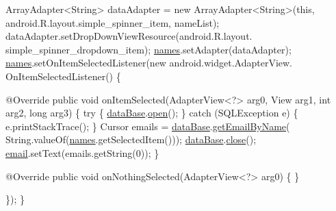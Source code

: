 \begin{DoxyCode}
        ArrayAdapter<String> dataAdapter = \textcolor{keyword}{new} ArrayAdapter<String>(\textcolor{keyword}{this}, 
      android.R.layout.simple\_spinner\_item, nameList);
        dataAdapter.setDropDownViewResource(android.R.layout.
      simple\_spinner\_dropdown\_item);
        \hyperlink{classnpi_1_1practicaandroid_1_1tutorialnpi_1_1_read_contact_ab89bd29616ad083286050296c58a408d}{names}.setAdapter(dataAdapter);
        \hyperlink{classnpi_1_1practicaandroid_1_1tutorialnpi_1_1_read_contact_ab89bd29616ad083286050296c58a408d}{names}.setOnItemSelectedListener(\textcolor{keyword}{new} android.widget.AdapterView.
      OnItemSelectedListener() \{

            @Override
            \textcolor{keyword}{public} \textcolor{keywordtype}{void} onItemSelected(AdapterView<?> arg0, View arg1,
                    \textcolor{keywordtype}{int} arg2, \textcolor{keywordtype}{long} arg3) \{
                \textcolor{keywordflow}{try} \{
                    \hyperlink{classnpi_1_1practicaandroid_1_1tutorialnpi_1_1_read_contact_a35e00fc352147780c9383f53d25227dd}{dataBase}.\hyperlink{classnpi_1_1practicaandroid_1_1tutorialnpi_1_1_adaptador_b_d_a128413ac90cfc708b95c21d946f9600d}{open}();
                \} \textcolor{keywordflow}{catch} (SQLException e) \{
                    e.printStackTrace();
                \}
                Cursor emails = \hyperlink{classnpi_1_1practicaandroid_1_1tutorialnpi_1_1_read_contact_a35e00fc352147780c9383f53d25227dd}{dataBase}.\hyperlink{classnpi_1_1practicaandroid_1_1tutorialnpi_1_1_adaptador_b_d_aef7ad90990381354464ef5f7b2464930}{getEmailByName}(
      String.valueOf(\hyperlink{classnpi_1_1practicaandroid_1_1tutorialnpi_1_1_read_contact_ab89bd29616ad083286050296c58a408d}{names}.getSelectedItem()));
                \hyperlink{classnpi_1_1practicaandroid_1_1tutorialnpi_1_1_read_contact_a35e00fc352147780c9383f53d25227dd}{dataBase}.\hyperlink{classnpi_1_1practicaandroid_1_1tutorialnpi_1_1_adaptador_b_d_a466dc4c61ae61457cf986b5d8c6f6f52}{close}();
                \hyperlink{classnpi_1_1practicaandroid_1_1tutorialnpi_1_1_read_contact_acac2ea2aae6d7bc822b86c9ee620f3e6}{email}.setText(emails.getString(0));    
            \}

            @Override
            \textcolor{keyword}{public} \textcolor{keywordtype}{void} onNothingSelected(AdapterView<?> arg0) \{                
            \}
            
        \});
    \}
\end{DoxyCode}
